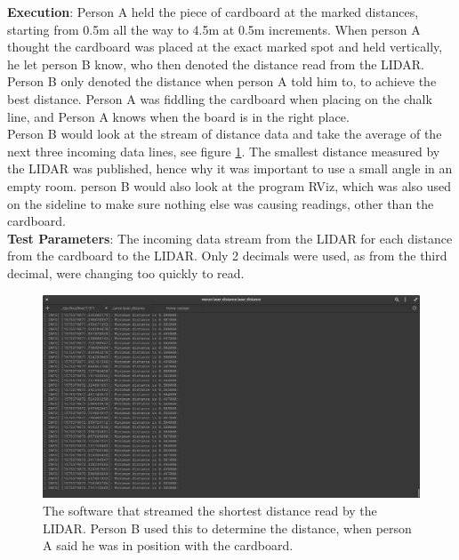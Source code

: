 \textbf{Execution}: Person A held the piece of cardboard at the marked distances, starting from 0.5m all the way to 4.5m at 0.5m increments. When person A thought the cardboard was placed at the exact marked spot and held vertically, he let person B know, who then denoted the distance read from the LIDAR. Person B only denoted the distance when person A told him to, to achieve the best distance. Person A was fiddling the cardboard when placing on the chalk line, and Person A knows when the board is in the right place.\\
Person B would look at the stream of distance data and take the average of the next three incoming data lines, see figure \ref{fig:AccuracySetup3}. The smallest distance measured by the LIDAR was published, hence why it was important to use a small angle in an empty room. person B would also look at the program RViz, which was also used on the sideline to make sure nothing else was causing readings, other than the cardboard.\\


\textbf{Test Parameters}: The incoming data stream from the LIDAR for each distance from the cardboard to the LIDAR. Only 2 decimals were used, as from the third decimal, were changing too quickly to read. 

\begin{figure}[H]
    \centering
    \includegraphics[width=1\textwidth]{figures/AccuracySetup3.png}
    \caption{The software that streamed the shortest distance read by the LIDAR. Person B used this to determine the distance, when person A said he was in position with the cardboard.}
    \label{fig:AccuracySetup3}
\end{figure}

